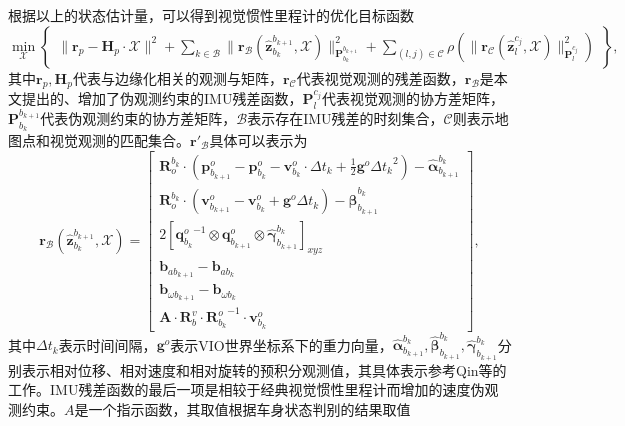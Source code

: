 根据以上的状态估计量，可以得到视觉惯性里程计的优化目标函数
\begin{equation}
  \min_{\mathcal{X}} 
  \begin{Bmatrix} 
  \| \symbf{r}_p - \symbf{H}_p \cdot \mathcal{X} \|^2 + \sum_{k\in\mathcal{B}} \| \symbf{r}_{\mathcal{B}}(\hat{\symbf{z}}_{b_k}^{b_{k+1}}, \mathcal{X}) \|^2_{\symbf{P}_{b_k}^{b_{k+1}}}
  + \sum_{(l,j)\in\mathcal{C}} \rho(\| \symbf{r}_{\mathcal{C}}(\hat{\symbf{z}}_{l}^{c_j}, \mathcal{X}) \|^2_{\symbf{P}_{l}^{c_j}}) \end{Bmatrix},
\end{equation}
其中$\symbf{r}_p, \symbf{H}_p$代表与边缘化相关的观测与矩阵，$\symbf{r}_{\mathcal{C}}$代表视觉观测的残差函数，$\symbf{r}_{\mathcal{B}}$是本文提出的、增加了伪观测约束的IMU残差函数，$\symbf{P}_{l}^{c_j}$代表视觉观测的协方差矩阵，$\symbf{P}_{b_k}^{b_{k+1}}$代表伪观测约束的协方差矩阵，$\mathcal{B}$表示存在IMU残差的时刻集合，$\mathcal{C}$则表示地图点和视觉观测的匹配集合。$\symbf{r}'_{\mathcal{B}}$具体可以表示为
\begin{equation}
  \symbf{r}_{\mathcal{B}}(\hat{\symbf{z}}_{b_k}^{b_{k+1}}, \mathcal{X}) = 
  \begin{bmatrix} 
    \symbf{R}_o^{b_k} \cdot (\symbf{p}_{b_{k+1}}^o -\symbf{p}_{b_k}^o-\symbf{v}_{b_k}^o\cdot\Delta t_k + \frac{1}{2}\symbf{g}^o{\Delta t_k}^2) - \hat{\symbf{\alpha}}_{b_{k+1}}^{b_k} \\
    \symbf{R}_o^{b_k} \cdot (\symbf{v}_{b_{k+1}}^o - \symbf{v}_{b_k}^o + \symbf{g}^o\Delta t_k) - \hat{\symbf{\beta}}_{b_{k+1}}^{b_k} \\
    2[{\symbf{q}^o_{b_k}}^{-1}\otimes\symbf{q}_{b_{k+1}}^o \otimes \hat{\symbf{\gamma}}_{b_{k+1}}^{b_k}]_{xyz} \\
    \symbf{b}_{ab_{k+1}} - \symbf{b}_{ab_{k}} \\
    \symbf{b}_{\omega b_{k+1}} - \symbf{b}_{\omega b_{k}} \\
    \symbf{A} \cdot \symbf{R}_b^v \cdot {\symbf{R}_{b_k}^o}^{-1} \cdot \symbf{v}_{b_k}^o
  \end{bmatrix},
  \label{eq:imu_residual}
\end{equation}
其中$\Delta t_k$表示时间间隔，$\symbf{g}^o$表示VIO世界坐标系下的重力向量，$\hat{\symbf{\alpha}}_{b_{k+1}}^{b_k}, \hat{\symbf{\beta}}_{b_{k+1}}^{b_k}, \hat{\symbf{\gamma}}_{b_{k+1}}^{b_k}$分别表示相对位移、相对速度和相对旋转的预积分观测值，其具体表示参考Qin等\cite{qin2018vins}的工作。IMU残差函数的最后一项是相较于经典视觉惯性里程计而增加的速度伪观测约束。$A$是一个指示函数，其取值根据车身状态判别的结果取值
